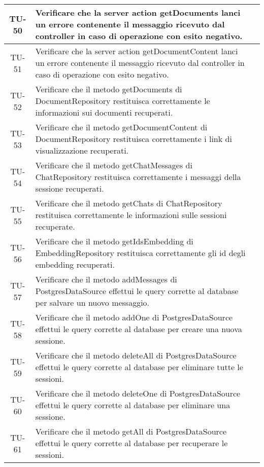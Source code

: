 \begin{xltabular}{\textwidth}{| c | X | c |}
    \hline
    TU-50 & Verificare che la server action getDocuments lanci un errore contenente il messaggio ricevuto dal controller in caso di operazione con esito negativo. & \textcolor{cmarkcolor}{} \\
    \hline
    TU-51 & Verificare che la server action getDocumentContent lanci un errore contenente il messaggio ricevuto dal controller in caso di operazione con esito negativo. & \textcolor{cmarkcolor}{} \\
    \hline
    TU-52 & Verificare che il metodo getDocuments di DocumentRepository restituisca correttamente le informazioni sui documenti recuperati. & \textcolor{cmarkcolor}{} \\ 
    \hline
    TU-53 & Verificare che il metodo getDocumentContent di DocumentRepository restituisca correttamente i link di visualizzazione recuperati. & \textcolor{cmarkcolor}{} \\
    \hline
    TU-54 & Verificare che il metodo getChatMessages di ChatRepository restituisca correttamente i messaggi della sessione recuperati. & \textcolor{cmarkcolor}{} \\
    \hline
    TU-55 & Verificare che il metodo getChats di ChatRepository restituisca correttamente le informazioni sulle sessioni recuperate. & \textcolor{cmarkcolor}{} \\
    \hline
    TU-56 & Verificare che il metodo getIdsEmbedding di EmbeddingRepository restituisca correttamente gli id degli embedding recuperati. & \textcolor{cmarkcolor}{} \\
    \hline
    TU-57 & Verificare che il metodo addMessages di PostgresDataSource effettui le query corrette al database per salvare un nuovo messaggio. & \textcolor{cmarkcolor}{} \\
    \hline
    TU-58 & Verificare che il metodo addOne di PostgresDataSource effettui le query corrette al database per creare una nuova sessione. & \textcolor{cmarkcolor}{} \\
    \hline
    TU-59 & Verificare che il metodo deleteAll di PostgresDataSource effettui le query corrette al database per eliminare tutte le sessioni. & \textcolor{cmarkcolor}{} \\
    \hline
    TU-60 & Verificare che il metodo deleteOne di PostgresDataSource effettui le query corrette al database per eliminare una sessione. & \textcolor{cmarkcolor}{} \\
    \hline
    TU-61 & Verificare che il metodo getAll di PostgresDataSource effettui le query corrette al database per recuperare le sessioni. & \textcolor{cmarkcolor}{} \\

\end{xltabular}
